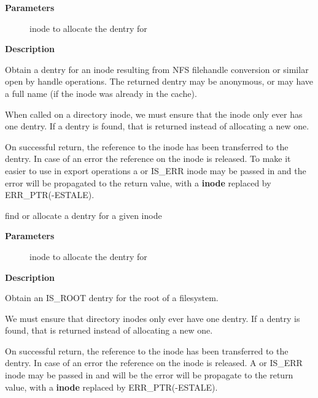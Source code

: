 \documentclass[a4paper,8pt,english]{sphinxmanual}
\begin{document}
\textbf{Parameters}
\begin{description}
\item[{}] \leavevmode
inode to allocate the dentry for

\end{description}

\textbf{Description}

Obtain a dentry for an inode resulting from NFS filehandle conversion or
similar open by handle operations.  The returned dentry may be anonymous,
or may have a full name (if the inode was already in the cache).

When called on a directory inode, we must ensure that the inode only ever
has one dentry.  If a dentry is found, that is returned instead of
allocating a new one.

On successful return, the reference to the inode has been transferred
to the dentry.  In case of an error the reference on the inode is released.
To make it easier to use in export operations a  or IS\_ERR inode may
be passed in and the error will be propagated to the return value,
with a  \textbf{inode} replaced by ERR\_PTR(-ESTALE).

\begin{fulllineitems}
\label{filesystems/index:c.d_obtain_root}
find or allocate a dentry for a given inode

\end{fulllineitems}


\textbf{Parameters}
\begin{description}
\item[{}] \leavevmode
inode to allocate the dentry for

\end{description}

\textbf{Description}

Obtain an IS\_ROOT dentry for the root of a filesystem.

We must ensure that directory inodes only ever have one dentry.  If a
dentry is found, that is returned instead of allocating a new one.

On successful return, the reference to the inode has been transferred
to the dentry.  In case of an error the reference on the inode is
released.  A  or IS\_ERR inode may be passed in and will be the
error will be propagate to the return value, with a  \textbf{inode}
replaced by ERR\_PTR(-ESTALE).
\end{document}
